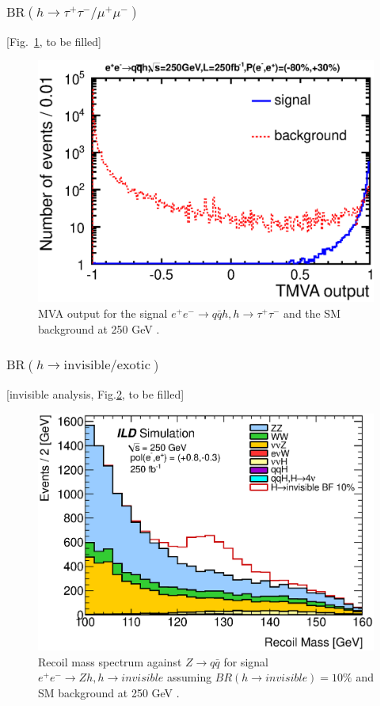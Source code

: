 \subsubsection{$\mathrm{BR}(h\to \tau^+\tau^-/\mu^+\mu^-)$}
[Fig.~\ref{fig:qqHtautau250}, to be filled]
\begin{figure}
\begin{center}
\includegraphics[width=0.85\hsize]{chapters/figures/ZH_qqtautau250_TMVA.eps}
\end{center}
  \caption{MVA output for the signal $e^+e^-\to q\bar{q} h, h\to\tau^+\tau^-$
 and the SM background at 250 GeV \cite{H2tautau250}.}
  \label{fig:qqHtautau250}
\end{figure}

\subsubsection{$\mathrm{BR}(h\to \mathrm{invisible/exotic})$}
[invisible analysis, Fig.\ref{fig:qqHinv250}, to be filled]
\begin{figure}
\begin{center}
\includegraphics[width=0.85\hsize]{chapters/figures/ZH_qqinv250_right.eps}
\end{center}
  \caption{Recoil mass spectrum against
 $Z\to q\bar{q}$ for signal $e^+e^-\to Zh, h\to invisible$ assuming $BR(h\to invisible)=10\%$
  and SM background  at 250 GeV \cite{H2inv250}.}
  \label{fig:qqHinv250}
\end{figure}


